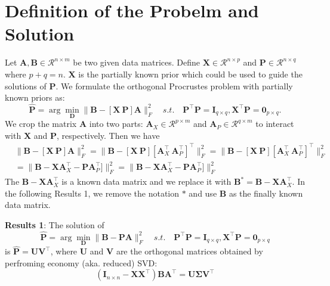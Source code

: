 \documentclass[titlepage,11pt,twoside]{article}
\begin{document}
\section{Definition of the Probelm and Solution}
Let $\mathbf{A},\mathbf{B}\in \mathcal{R}^{n\times m}$ be two given data matrices. Define $\mathbf{X}\in\mathcal{R}^{n\times p}$ and $\mathbf{P}\in\mathcal{R}^{n\times q}$ where $p+q=n$. $\mathbf{X}$ is the partially known prior which could be used to guide the solutions of $\mathbf{P}$. We formulate the orthogonal Procrustes problem with partially known priors as:
\begin{equation}
\mathbf{\hat{P}}=\arg\min_{\mathbf{D}}\|\mathbf{B}-[\mathbf{X}\ \mathbf{P}]\mathbf{A}\|_{F}^{2}
\quad
s.t.
\quad
\mathbf{P}^{\top}\mathbf{P} = \mathbf{I}_{q\times q}, \mathbf{X}^{\top}\mathbf{P} = \mathbf{0}_{p\times q}.
\end{equation} 
We crop the matrix $\mathbf{A}$ into two parts: $\mathbf{A}_{X}\in\mathcal{R}^{p\times m}$ and $\mathbf{A}_{P}\in\mathcal{R}^{q\times m}$ to interact with $\mathbf{X}$ and $\mathbf{P}$, respectively. Then we have 
\begin{equation}
\begin{split}
&
\|\mathbf{B}-[\mathbf{X}\ \mathbf{P}]\mathbf{A}\|_{F}^{2}
=\|\mathbf{B}-[\mathbf{X}\ \mathbf{P}][\mathbf{A}_{X}^{\top}\ \mathbf{A}_{P}^{\top}]^{\top}\|_{F}^{2}
=\|\mathbf{B}-[\mathbf{X}\ \mathbf{P}][\mathbf{A}_{X}^{\top}\ \mathbf{A}_{P}^{\top}]^{\top}\|_{F}^{2}
\\
&
=\|\mathbf{B}-\mathbf{X}\mathbf{A}_{X}^{\top} - \mathbf{P}\mathbf{A}_{P}^{\top}]\|_{F}^{2}
=\|\mathbf{B}-\mathbf{X}\mathbf{A}_{X}^{\top} - \mathbf{P}\mathbf{A}_{P}^{\top}]\|_{F}^{2}
\end{split}
\end{equation}
The $\mathbf{B}-\mathbf{X}\mathbf{A}_{X}^{\top}$ is a known data matrix and we replace it with 
$\mathbf{B}^{*}=\mathbf{B}-\mathbf{X}\mathbf{A}_{X}^{\top}$. In the following Results 1, we remove the notation $*$ and use $\mathbf{B}$ as the finally known data matrix.

\textbf{Results 1}: The solution of
\begin{equation}
\mathbf{\hat{P}}=\arg\min_{\mathbf{D}}\|\mathbf{B}-\mathbf{P}\mathbf{A}\|_{F}^{2}
\quad
s.t.
\quad
\mathbf{P}^{\top}\mathbf{P} = \mathbf{I}_{q\times q}, \mathbf{X}^{\top}\mathbf{P} = \mathbf{0}_{p\times q} 
\end{equation}
is $\mathbf{\hat{P}} = \mathbf{U}\mathbf{V}^{\top}$, where $\mathbf{U}$ and $\mathbf{V}$ are the orthogonal matrices obtained by perfroming economy (aka. reduced) SVD:
\begin{equation}
(\mathbf{I}_{n\times n}-\mathbf{X}\mathbf{X}^{\top})\mathbf{B}\mathbf{A}^{\top} = \mathbf{U}\mathbf{\Sigma}\mathbf{V}^{\top}
\end{equation}
\end{document}
